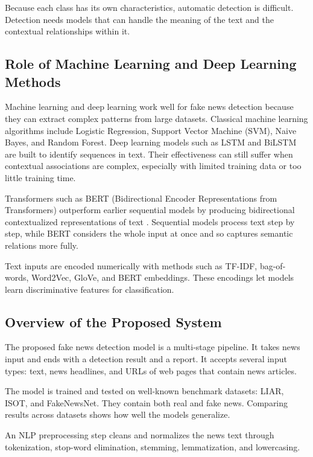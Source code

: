 \documentclass[runningheads]{llncs}
\begin{document}
Because each class has its own characteristics, automatic detection is difficult. Detection needs models that can handle the meaning of the text and the contextual relationships within it.

\subsection{Role of Machine Learning and Deep Learning Methods}

Machine learning and deep learning work well for fake news detection because they can extract complex patterns from large datasets. Classical machine learning algorithms include Logistic Regression, Support Vector Machine (SVM), Naive Bayes, and Random Forest. Deep learning models such as LSTM and BiLSTM are built to identify sequences in text. Their effectiveness can still suffer when contextual associations are complex, especially with limited training data or too little training time.

Transformers such as BERT (Bidirectional Encoder Representations from Transformers) outperform earlier sequential models by producing bidirectional contextualized representations of text \cite{Kaliyar2021FakeBERT,Mehta2022RecentTrends}. Sequential models process text step by step, while BERT considers the whole input at once and so captures semantic relations more fully.

Text inputs are encoded numerically with methods such as TF-IDF, bag-of-words, Word2Vec, GloVe, and BERT embeddings. These encodings let models learn discriminative features for classification.

\subsection{Overview of the Proposed System}

The proposed fake news detection model is a multi-stage pipeline. It takes news input and ends with a detection result and a report. It accepts several input types: text, news headlines, and URLs of web pages that contain news articles.

The model is trained and tested on well-known benchmark datasets: LIAR, ISOT, and FakeNewsNet. They contain both real and fake news. Comparing results across datasets shows how well the models generalize.

An NLP preprocessing step cleans and normalizes the news text through tokenization, stop-word elimination, stemming, lemmatization, and lowercasing.
\end{document}
